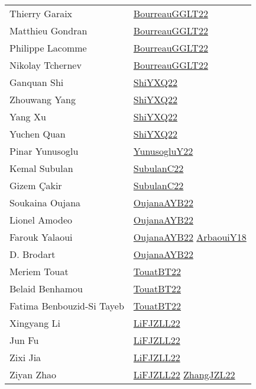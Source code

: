 {\begin{longtable}{p{4cm}p{15cm}}
Thierry Garaix & \href{articles/BourreauGGLT22.pdf}{BourreauGGLT22}\cite{BourreauGGLT22} \\
Matthieu Gondran & \href{articles/BourreauGGLT22.pdf}{BourreauGGLT22}\cite{BourreauGGLT22} \\
Philippe Lacomme & \href{articles/BourreauGGLT22.pdf}{BourreauGGLT22}\cite{BourreauGGLT22} \\
Nikolay Tchernev & \href{articles/BourreauGGLT22.pdf}{BourreauGGLT22}\cite{BourreauGGLT22} \\
Ganquan Shi & \href{articles/ShiYXQ22.pdf}{ShiYXQ22}\cite{ShiYXQ22} \\
Zhouwang Yang & \href{articles/ShiYXQ22.pdf}{ShiYXQ22}\cite{ShiYXQ22} \\
Yang Xu & \href{articles/ShiYXQ22.pdf}{ShiYXQ22}\cite{ShiYXQ22} \\
Yuchen Quan & \href{articles/ShiYXQ22.pdf}{ShiYXQ22}\cite{ShiYXQ22} \\
Pinar Yunusoglu & \href{articles/YunusogluY22.pdf}{YunusogluY22}\cite{YunusogluY22} \\
Kemal Subulan & \href{articles/SubulanC22.pdf}{SubulanC22}\cite{SubulanC22} \\
Gizem {\c{C}}akir & \href{articles/SubulanC22.pdf}{SubulanC22}\cite{SubulanC22} \\
Soukaina Oujana & \href{papers/OujanaAYB22.pdf}{OujanaAYB22}\cite{OujanaAYB22} \\
Lionel Amodeo & \href{papers/OujanaAYB22.pdf}{OujanaAYB22}\cite{OujanaAYB22} \\
Farouk Yalaoui & \href{papers/OujanaAYB22.pdf}{OujanaAYB22}\cite{OujanaAYB22} \href{papers/ArbaouiY18.pdf}{ArbaouiY18}\cite{ArbaouiY18} \\
D. Brodart & \href{papers/OujanaAYB22.pdf}{OujanaAYB22}\cite{OujanaAYB22} \\
Meriem Touat & \href{papers/TouatBT22.pdf}{TouatBT22}\cite{TouatBT22} \\
Belaid Benhamou & \href{papers/TouatBT22.pdf}{TouatBT22}\cite{TouatBT22} \\
Fatima Benbouzid{-}Si Tayeb & \href{papers/TouatBT22.pdf}{TouatBT22}\cite{TouatBT22} \\
Xingyang Li & \href{papers/LiFJZLL22.pdf}{LiFJZLL22}\cite{LiFJZLL22} \\
Jun Fu & \href{papers/LiFJZLL22.pdf}{LiFJZLL22}\cite{LiFJZLL22} \\
Zixi Jia & \href{papers/LiFJZLL22.pdf}{LiFJZLL22}\cite{LiFJZLL22} \\
Ziyan Zhao & \href{papers/LiFJZLL22.pdf}{LiFJZLL22}\cite{LiFJZLL22} \href{papers/ZhangJZL22.pdf}{ZhangJZL22}\cite{ZhangJZL22} \\

\end{longtable}}
